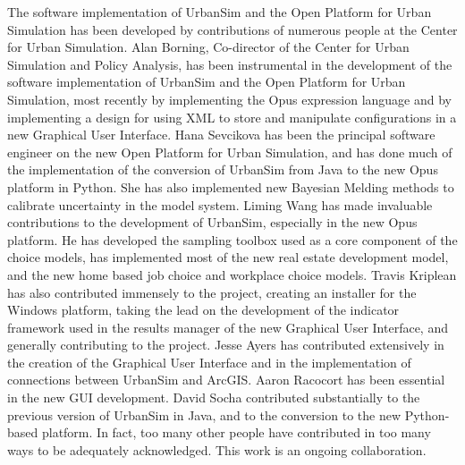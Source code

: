 The software implementation of UrbanSim and the Open Platform for Urban 
Simulation has been developed by contributions of numerous people at the 
Center for Urban Simulation.  Alan Borning, Co-director of the Center 
for Urban Simulation and Policy Analysis, has been instrumental in the 
development of the software implementation of UrbanSim and the Open 
Platform for Urban Simulation, most recently by implementing the Opus
 expression language and by implementing
a design for using XML to store and manipulate configurations in a new 
Graphical User Interface.  Hana Sevcikova has been the principal software 
engineer
on the new Open Platform for Urban Simulation, and has done much of the 
implementation of the conversion of UrbanSim from Java to the new Opus 
platform in Python.  She has also implemented new Bayesian Melding methods 
to calibrate uncertainty in the model system.  Liming Wang has made invaluable 
contributions to the development of UrbanSim, especially in the new Opus 
platform.  He has developed the sampling toolbox used as a core component
of the choice models, has implemented most of the new real estate development
 model, and the new home based job choice and workplace choice models.
Travis Kriplean has also contributed immensely to the project, creating 
an installer for the Windows platform, taking the lead on the development 
of the
indicator framework used in the results manager of the new Graphical User
 Interface, and generally contributing to the project.  Jesse Ayers has 
contributed
extensively in the creation of the Graphical User Interface and in the 
implementation of connections between UrbanSim and ArcGIS.  Aaron Racocort 
has been essential in the new GUI development.  David Socha contributed
substantially to the previous version of UrbanSim in Java, and to the 
conversion to the new Python-based platform.  In fact, too many other 
people have contributed in too many ways to be adequately acknowledged.  
This work is an ongoing collaboration.


